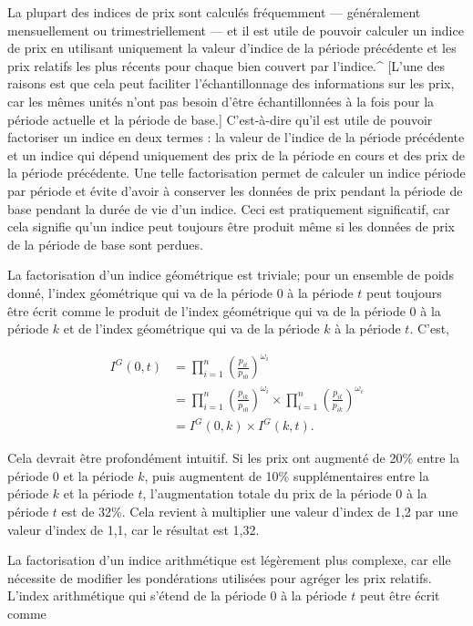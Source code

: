 \documentclass[
]{article}
\begin{document}
La plupart des indices de prix sont calculés fréquemment --- généralement mensuellement ou trimestriellement --- et il est utile de pouvoir calculer un indice de prix en utilisant uniquement la valeur d'indice de la période précédente et les prix relatifs les plus récents pour chaque bien couvert par l'indice.\^{} {[}L'une des raisons est que cela peut faciliter l'échantillonnage des informations sur les prix, car les mêmes unités n'ont pas besoin d'être échantillonnées à la fois pour la période actuelle et la période de base.{]} C'est-à-dire qu'il est utile de pouvoir factoriser un indice en deux termes : la valeur de l'indice de la période précédente et un indice qui dépend uniquement des prix de la période en cours et des prix de la période précédente. Une telle factorisation permet de calculer un indice période par période et évite d'avoir à conserver les données de prix pendant la période de base pendant la durée de vie d'un indice. Ceci est pratiquement significatif, car cela signifie qu'un indice peut toujours être produit même si les données de prix de la période de base sont perdues.

La factorisation d'un indice géométrique est triviale; pour un ensemble de poids donné, l'index géométrique qui va de la période 0 à la période \(t\) peut toujours être écrit comme le produit de l'index géométrique qui va de la période 0 à la période \(k\) et de l'index géométrique qui va de la période \(k\) à la période \(t\). C'est,

\begin{align*}
I^{G}(0, t) & = \prod_{i = 1}^{n} \left (\frac{p_{it}}{p_{i0}} \right)^{\omega_i} \\
& = \prod_{i = 1}^{n} \left (\frac{p_{ik}}{p_{i0}} \right)^{\omega_i} \times \prod_{i = 1}^{n } \left (\frac{p_{it}}{p_{ik}} \right)^{\omega_i} \\
& = I^{G}(0, k) \times I^{G}(k, t).
\end{align*}

Cela devrait être profondément intuitif. Si les prix ont augmenté de 20\% entre la période 0 et la période \(k\), puis augmentent de 10\% supplémentaires entre la période \(k\) et la période \(t\), l'augmentation totale du prix de la période 0 à la période \(t\) est de 32\%. Cela revient à multiplier une valeur d'index de 1,2 par une valeur d'index de 1,1, car le résultat est 1,32.

La factorisation d'un indice arithmétique est légèrement plus complexe, car elle nécessite de modifier les pondérations utilisées pour agréger les prix relatifs. L'index arithmétique qui s'étend de la période 0 à la période \(t\) peut être écrit comme
\end{document}
